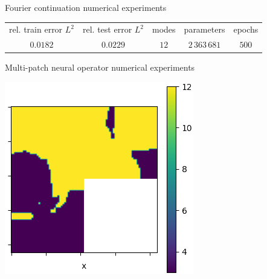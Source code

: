 \documentclass{beamer}
\begin{document}
\begin{frame}{Fourier continuation numerical experiments}
\begin{center}
\begin{minipage}{0.24\textwidth}
        \end{minipage}
    \end{center}
	\begin{table}[h!] %
		\centering
		\begin{tabular}{ccccc}\toprule
		rel. train error $ L^2 $ & rel. test error $L^2$ & modes & parameters & epochs \\
			\cmidrule{1-5}
			$ 0.0182 $ & $0.0229$ & $12$ & $ 2\, 363\, 681 $ & $500$ \\
			\bottomrule
		\end{tabular}
	\end{table}
\end{frame}


\begin{frame}{Multi-patch neural operator numerical experiments}
	\begin{center}
        \begin{minipage}{0.24\textwidth}
            \includegraphics[width=\textwidth]{MPNO_input.png}
        \end{minipage}
        \hfill
        \begin{minipage}{0.24\textwidth}

\end{minipage}
\end{center}
\end{frame}
\end{document}
